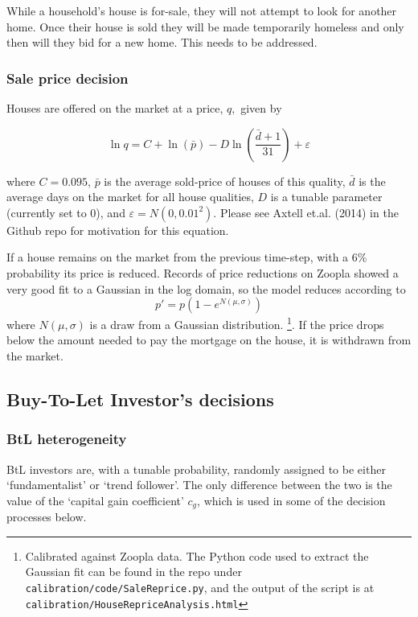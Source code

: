 \documentclass{report}
\begin{document}
While a household's house is for-sale, they will not attempt to look for another home. Once their house is sold they will be made temporarily homeless and only then will they bid for a new home. This needs to be addressed.

\subsubsection{Sale price decision}
\label{saleprice}
Houses are offered on the market at a price, $q,$ given by

\begin{equation}
\ln q=C+\ln (\bar{p})-D\ln \left( \frac{\bar{d}+1}{31}\right) +\varepsilon
\label{salepriceeq}
\end{equation}

where $C=0.095$, $\bar{p}$ is the average sold-price of houses of this quality, $\bar{d}$ is the average days on the market for all house qualities, $D$ is a tunable parameter (currently set to 0), and $\varepsilon=N(0,0.01^{2})$. Please see Axtell et.al. (2014) in the Github repo for motivation for this equation.

If a house remains on the market from the previous time-step, with a 6\%
probability its price is reduced. Records of price reductions on Zoopla showed a very good fit to a Gaussian in the log domain, so the model reduces according to
\begin{equation}
p' = p\left(1-e^{N(\mu,\sigma)}\right)
\label{reprice}
\end{equation}
where $N(\mu,\sigma)$ is a draw from a Gaussian distribution.  \footnote{Calibrated against Zoopla data. The Python code used to extract the Gaussian fit can be found in the repo under \texttt{calibration/code/SaleReprice.py}, and the output of the script is at \texttt{calibration/HouseRepriceAnalysis.html}}. If the price drops below the amount needed to pay the mortgage on the house, it is withdrawn from the market.

\subsection{Buy-To-Let Investor's decisions}
\subsubsection{BtL heterogeneity}
BtL investors are, with a tunable probability, randomly assigned to be either `fundamentalist' or `trend follower'. The only difference between the two is the value of the `capital gain coefficient' $c_{g}$, which is used in some of the decision processes below.
\end{document}
